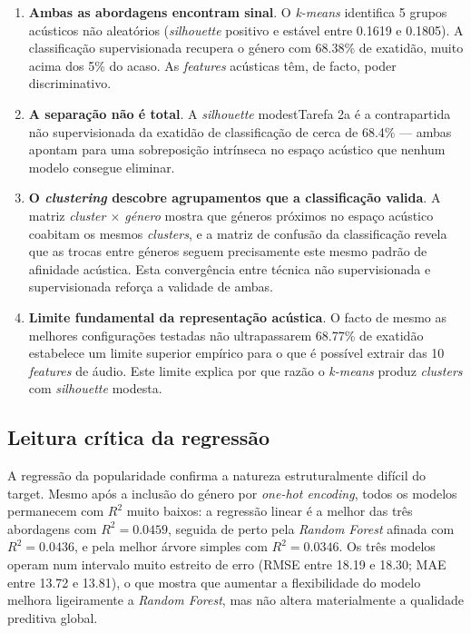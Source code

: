 \documentclass[11pt,a4paper]{article}
\begin{document}
\begin{enumerate}
    \item \textbf{Ambas as abordagens encontram sinal}. O \textit{k-means} identifica 5 grupos acústicos não aleatórios (\textit{silhouette} positivo e estável entre 0.1619 e 0.1805). A classificação supervisionada recupera o género com 68.38\% de exatidão, muito acima dos 5\% do acaso. As \textit{features} acústicas têm, de facto, poder discriminativo.

    \item \textbf{A separação não é total}. A \textit{silhouette} modestTarefa 2a é a contrapartida não supervisionada da exatidão de classificação de cerca de 68.4\% --- ambas apontam para uma sobreposição intrínseca no espaço acústico que nenhum modelo consegue eliminar.

    \item \textbf{O \textit{clustering} descobre agrupamentos que a classificação valida}. A matriz \textit{cluster $\times$ género} mostra que géneros próximos no espaço acústico coabitam os mesmos \textit{clusters}, e a matriz de confusão da classificação revela que as trocas entre géneros seguem precisamente este mesmo padrão de afinidade acústica. Esta convergência entre técnica não supervisionada e supervisionada reforça a validade de ambas.

    \item \textbf{Limite fundamental da representação acústica}. O facto de mesmo as melhores configurações testadas não ultrapassarem 68.77\% de exatidão estabelece um limite superior empírico para o que é possível extrair das 10 \textit{features} de áudio. Este limite explica por que razão o \textit{k-means} produz \textit{clusters} com \textit{silhouette} modesta.
\end{enumerate}

\subsection{Leitura crítica da regressão}

A regressão da popularidade confirma a natureza estruturalmente difícil do target. Mesmo após a inclusão do género por \textit{one-hot encoding}, todos os modelos permanecem com $R^2$ muito baixos: a regressão linear é a melhor das três abordagens com \textbf{$R^2 = 0.0459$}, seguida de perto pela \textit{Random Forest} afinada com \textbf{$R^2 = 0.0436$}, e pela melhor árvore simples com \textbf{$R^2 = 0.0346$}. Os três modelos operam num intervalo muito estreito de erro (RMSE entre 18.19 e 18.30; MAE entre 13.72 e 13.81), o que mostra que aumentar a flexibilidade do modelo melhora ligeiramente a \textit{Random Forest}, mas não altera materialmente a qualidade preditiva global.
\end{document}
